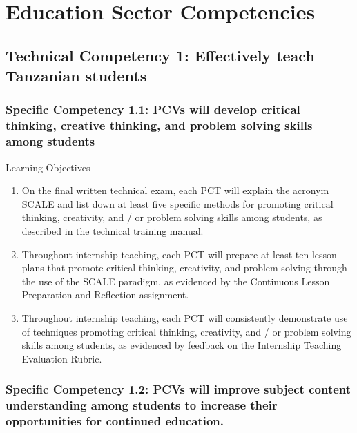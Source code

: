 \section{Education Sector Competencies}
\subsection*{Technical Competency 1: Effectively teach Tanzanian students}

\subsubsection*{Specific Competency 1.1: PCVs will develop critical thinking, creative thinking, and problem solving skills among students}

Learning Objectives
\begin{enumerate}
\item On the final written technical exam, each PCT will explain the acronym SCALE and list down at least five specific methods for promoting critical thinking, creativity, and / or problem solving skills among students, as described in the technical training manual.

\item Throughout internship teaching, each PCT will prepare at least ten
lesson plans that promote critical thinking, creativity, and problem
solving through the use of the SCALE paradigm, as evidenced by the
Continuous Lesson Preparation and Reflection assignment.

\item  Throughout internship teaching, each PCT will consistently demonstrate use of techniques promoting critical thinking, creativity, and /
or problem solving skills among students, as evidenced by feedback on
the Internship Teaching Evaluation Rubric.
\end{enumerate}

\subsubsection*{Specific Competency 1.2: PCVs will improve subject
content understanding among students to increase their
opportunities for continued education.}

